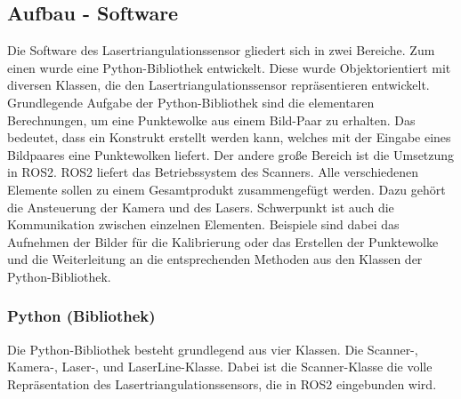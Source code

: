 	
	\label{chap:aufbau_hardware}
	
	\newpage
	
	\subsection{Aufbau - Software}
	Die Software des Lasertriangulationssensor gliedert sich in zwei Bereiche. Zum einen wurde eine Python-Bibliothek entwickelt. Diese wurde Objektorientiert mit diversen Klassen, die den Lasertriangulationssensor repräsentieren entwickelt. Grundlegende Aufgabe der Python-Bibliothek sind die elementaren Berechnungen, um eine Punktewolke aus einem Bild-Paar zu erhalten. Das bedeutet, dass ein Konstrukt erstellt werden kann, welches mit der Eingabe eines Bildpaares eine Punktewolken liefert. \newline
	Der andere große Bereich ist die Umsetzung in ROS2. ROS2 liefert das Betriebssystem des Scanners. Alle verschiedenen Elemente sollen zu einem Gesamtprodukt zusammengefügt werden. Dazu gehört die Ansteuerung der Kamera und des Lasers. Schwerpunkt ist auch die Kommunikation zwischen einzelnen Elementen. Beispiele sind dabei das Aufnehmen der Bilder für die Kalibrierung oder das Erstellen der Punktewolke und die Weiterleitung an die entsprechenden Methoden aus den Klassen der Python-Bibliothek.
		\subsubsection{Python (Bibliothek)}
		Die Python-Bibliothek besteht grundlegend aus vier Klassen. Die Scanner-, Kamera-, Laser-, und LaserLine-Klasse. Dabei ist die Scanner-Klasse die volle Repräsentation des Lasertriangulationssensors, die in ROS2 eingebunden wird.
		
